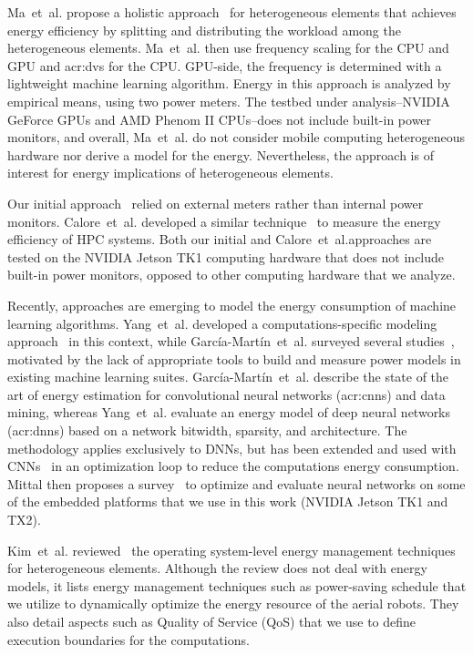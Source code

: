 Ma~et~al. propose a holistic approach~\citep{ma2012holistic} for heterogeneous elements that achieves energy efficiency by splitting and distributing the workload among the heterogeneous elements. Ma~et~al. then use frequency scaling for the CPU and GPU and \Gls{acr:dvs} for the CPU. GPU-side, the frequency is determined with a lightweight machine learning algorithm. Energy in this approach is analyzed by empirical means, using two power meters. The testbed under analysis--NVIDIA GeForce GPUs and AMD Phenom II CPUs--does not include built-in power monitors, and overall, Ma~et~al. do not consider mobile computing heterogeneous hardware nor derive a model for the energy. Nevertheless, the approach is of interest for energy implications of heterogeneous elements.

Our initial approach~\citep{seewald2019hlpgpu} relied on external meters rather than internal power monitors. Calore~et~al. developed a similar technique~\citep{calore2015energy} to measure the energy efficiency of HPC systems. Both our initial and Calore~et~al.approaches are tested on the NVIDIA Jetson TK1 computing hardware that does not include built-in power monitors, opposed to other computing hardware that we analyze.

Recently, approaches are emerging to model the energy consumption of machine learning algorithms.
Yang~et~al. developed a computations-specific modeling approach~\citep{yang2017method} in this context, while Garc{\'i}a-Mart{\'i}n~et~al. surveyed several studies~\citep{garcia2019estimation}, motivated by the lack of appropriate tools to build and measure power models in existing machine learning suites. Garc{\'i}a-Mart{\'i}n~et~al. describe the state of the art of energy estimation for convolutional neural networks (\Gls{acr:cnn}s) and data mining, whereas Yang~et~al. evaluate an energy model of deep neural networks (\Gls{acr:dnn}s) based on a network bitwidth, sparsity, and architecture. The methodology applies exclusively to DNNs, but has been extended and used with CNNs~\citep{yang2017designing} in an optimization loop to reduce the computations energy consumption. Mittal then proposes a survey~\citep{mittal2019survey} to optimize and evaluate neural networks on some of the embedded platforms that we use in this work (NVIDIA Jetson TK1 and TX2). 

Kim~et~al. reviewed~\citep{kim2018survey} the operating system-level energy management techniques for heterogeneous elements. Although the review does not deal with energy models, it lists energy management techniques such as power-saving schedule that we utilize to dynamically optimize the energy resource of the aerial robots. They also detail aspects such as Quality of Service (QoS) that we use to define execution boundaries for the computations.

